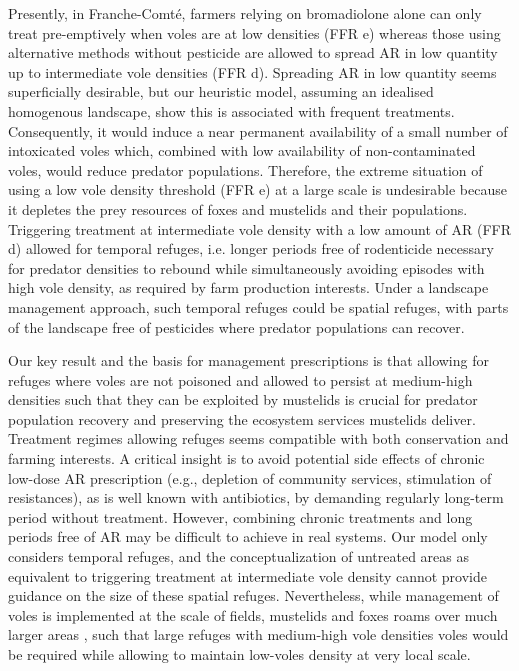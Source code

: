 \documentclass[11pt]{article}
\begin{document}
Presently, in Franche-Comté, farmers relying on bromadiolone alone can only treat pre-emptively when voles are at low densities (FFR e) whereas those using alternative methods without pesticide are allowed to spread AR in low quantity up to intermediate vole densities (FFR d). Spreading AR in low quantity seems superficially desirable, but our heuristic model, assuming an idealised homogenous landscape, show this is associated with frequent treatments. Consequently, it would induce a near permanent availability of a small number of intoxicated voles which, combined with low availability of non-contaminated voles, would reduce predator populations. Therefore, the extreme situation of using a low vole density threshold (FFR e) at a large scale is undesirable because it depletes the prey resources of foxes and mustelids and their populations. Triggering treatment at intermediate vole density with a low amount of AR (FFR d) allowed for temporal refuges, i.e. longer periods free of rodenticide necessary for predator densities to rebound while simultaneously avoiding episodes with high vole density, as required by farm production interests. Under a landscape management approach, such temporal refuges could be spatial refuges, with parts of the landscape free of pesticides where predator populations can recover.

Our key result and the basis for management prescriptions is that allowing for refuges where voles are not poisoned and allowed to persist at medium-high densities such that they can be exploited by mustelids is crucial for predator population recovery and preserving the ecosystem services mustelids deliver.  Treatment regimes allowing refuges seems compatible with both conservation and farming interests. A critical insight is to avoid potential side effects of chronic low-dose AR prescription (e.g., depletion of community services, stimulation of resistances), as is well known with antibiotics, by demanding regularly long-term period without treatment. However, combining chronic treatments and long periods free of AR may be difficult to achieve in real systems. Our model only considers temporal refuges, and the conceptualization of untreated areas as equivalent to triggering treatment at intermediate vole density cannot provide guidance on the size of these spatial refuges. Nevertheless, while management of voles is implemented at the scale of fields, mustelids and foxes roams over much larger areas  \citep{King2006}, such that large refuges with medium-high vole densities voles would be required while allowing to maintain low-voles density at very local scale.
\end{document}
